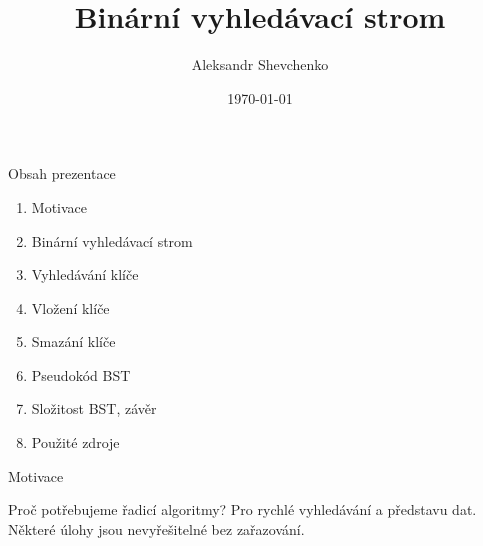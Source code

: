 \documentclass[10pt]{beamer}
\title[Short title]{\huge Binární vyhledávací strom}
\author{\Large Aleksandr Shevchenko}
\institute{\small Vysoké učení technické v Brně\\
    Fakulta informačních technologií}
\date{\today}
\begin{document}

\begin{frame}
    \titlepage
\end{frame}

\begin{frame}{Obsah prezentace}
    \begin{enumerate}
    \item Motivace
    \item Binární vyhledávací strom
    \item Vyhledávání klíče
    \item Vložení klíče
    \item Smazání klíče
    \item Pseudokód BST
    \item Složitost BST, závěr
    \item Použité zdroje
    \end{enumerate}
\end{frame}

\begin{frame}[t]{Motivace}
    \smallskip
    \begin{block}{Proč potřebujeme řadicí algoritmy?}
    \medskip
    Pro rychlé vyhledávání a představu dat. Některé úlohy jsou nevyřešitelné bez zařazování.
    \end{block}
    \bigskip
    \bigskip
    \begin{columns}[onlytextwidth]
    \end{columns}
\end{frame}
\end{document}
